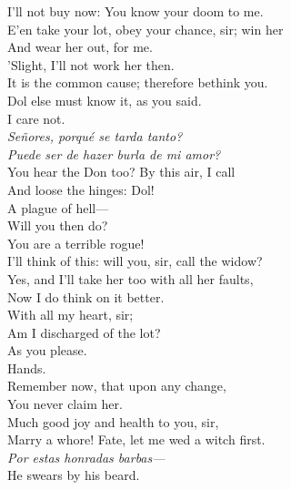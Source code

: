 \documentclass[a4paper,oneside,12pt]{memoir}
\begin{document}
\begin{drama*}
I'll not buy now: You know your doom to me.\\
E'en take your lot, obey your chance, sir; win her\\
And wear her out, for me.\\
\subtlespeaks {} 'Slight, I'll not work her then.\\
\facespeaks It is the common cause; therefore bethink you.\\
Dol else must know it, as you said.\\
\subtlespeaks {} I care not.\\
\surlyspeaks \emph{Se\~{n}ores, porqu\'{e} se tarda tanto?\\
Puede ser de hazer burla de mi amor?}\\
\facespeaks You hear the Don too? By this air, I call\\
And loose the hinges: Dol!\\
\subtlespeaks {} A plague of hell---\\
\facespeaks Will you then do?\\
\subtlespeaks {} You are a terrible rogue!\\
I'll think of this: will you, sir, call the widow?\\
\facespeaks Yes, and I'll take her too with all her faults,\\
Now I do think on it better.\\
\subtlespeaks {} With all my heart, sir;\\
Am I discharged of the lot?\\
\facespeaks {} As you please.\\
\subtlespeaks {} Hands.\\
\facespeaks Remember now, that upon any change,\\
You never claim her.\\
\subtlespeaks {} Much good joy and health to you, sir,\\
Marry a whore! Fate, let me wed a witch first.\\
\surlyspeaks \emph{Por estas honradas barbas---}\\
\subtlespeaks {} He swears by his beard.\\

\end{drama*}
\end{document}
